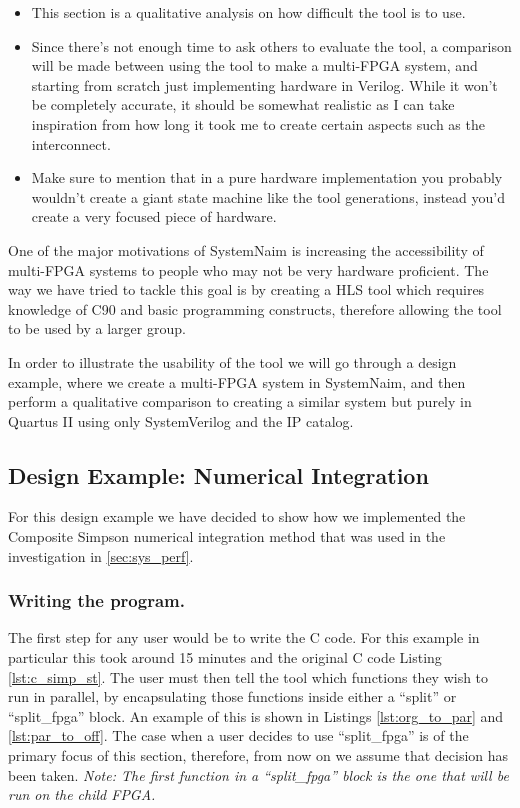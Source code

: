 \begin{itemize}
    \item This section is a qualitative analysis on how difficult the tool is to use. 
    \item Since there's not enough time to ask others to evaluate the tool, a comparison will be made between using the tool to make a multi-FPGA system, and starting from scratch just implementing hardware in Verilog. While it won't be completely accurate, it should be somewhat realistic as I can take inspiration from how long it took me to create certain aspects such as the interconnect.
    \item Make sure to mention that in a pure hardware implementation you probably wouldn't create a giant state machine like the tool generations, instead you'd create a very focused piece of hardware.
\end{itemize}

One of the major motivations of SystemNaim is increasing the accessibility of multi-FPGA systems to people who may not be very hardware proficient. The way we have tried to tackle this goal is by creating a HLS tool which requires knowledge of C90 and basic programming constructs, therefore allowing the tool to be used by a larger group. 

In order to illustrate the usability of the tool we will go through a design example, where we create a multi-FPGA system in SystemNaim,  and then perform a qualitative comparison to creating a similar system but purely in Quartus II using only SystemVerilog and the IP catalog.

\subsection{Design Example: Numerical Integration}
\label{sec:design_example}


For this design example we have decided to show how we implemented the Composite Simpson numerical integration method that was used in the investigation in \autoref{sec:sys_perf}.


\subsubsection{Writing the program.}

The first step for any user would be to write the C code. For this example in particular this took around 15 minutes and the original C code Listing \ref{lst:c_simp_st}. The user must then tell the tool which functions they wish to run in parallel, by encapsulating those functions inside either a “split” or “split\_fpga” block. An example of this is shown in Listings \ref{lst:org_to_par} and \ref{lst:par_to_off}. The case when a user decides to use “split\_fpga” is of the primary focus of this section, therefore, from now on we assume that decision has been taken. \textit{Note: The first function in a “split\_fpga” block is the one that will be run on the child FPGA.} 

